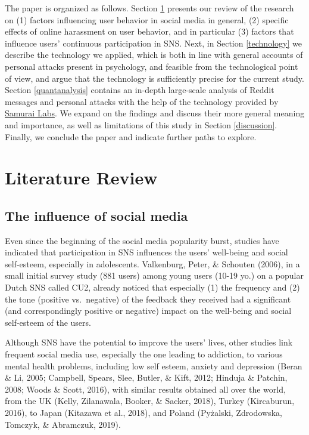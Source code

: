 \documentclass[
  10pt,
  dvipsnames]{scrartcl}
\begin{document}
The paper is organized as follows. Section \ref{literaturereview}
presents our review of the research on (1) factors influencing user
behavior in social media in general, (2) specific effects of online
harassment on user behavior, and in particular (3) factors that
influence users' continuous participation in SNS. Next, in Section
\ref{technology} we describe the technology we applied, which is both in
line with general accounts of personal attacks present in psychology,
and feasible from the technological point of view, and argue that the
technology is sufficiently precise for the current study. Section
\ref{quantanalysis} contains an in-depth large-scale analysis of Reddit
messages and personal attacks with the help of the technology provided
by \href{https://www.samurailabs.ai/}{\textsf{Samurai Labs}}. We expand
on the findings and discuss their more general meaning and importance,
as well as limitations of this study in Section \ref{discussion}.
Finally, we conclude the paper and indicate further paths to explore.

\section{Literature Review}
\label{literaturereview}

\subsection{The influence of  social media}

Even since the beginning of the social media popularity burst, studies
have indicated that participation in SNS influences the users'
well-being and social self-esteem, especially in adolescents.
Valkenburg, Peter, \& Schouten (2006), in a small initial survey study
(881 users) among young users (10-19 yo.) on a popular Dutch SNS called
CU2, already noticed that especially (1) the frequency and (2) the tone
(positive vs.~negative) of the feedback they received had a significant
(and correspondingly positive or negative) impact on the well-being and
social self-esteem of the users.

Although SNS have the potential to improve the users' lives, other
studies link frequent social media use, especially the one leading to
addiction, to various mental health problems, including low self esteem,
anxiety and depression (Beran \& Li, 2005; Campbell, Spears, Slee,
Butler, \& Kift, 2012; Hinduja \& Patchin, 2008; Woods \& Scott, 2016),
with similar results obtained all over the world, from the UK (Kelly,
Zilanawala, Booker, \& Sacker, 2018), Turkey (Kircaburun, 2016), to
Japan (Kitazawa et al., 2018), and Poland (Pyżalski, Zdrodowska,
Tomczyk, \& Abramczuk, 2019).
\end{document}
